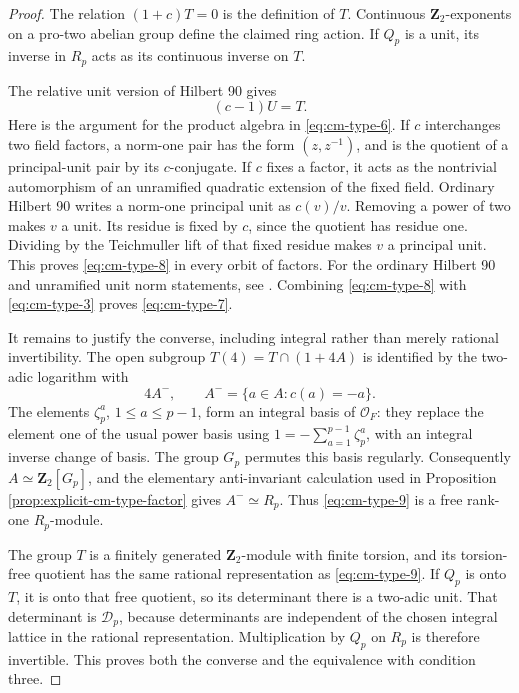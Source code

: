 \begin{proof}
The relation \((1+c)T=0\) is the definition of \(T\). Continuous
\(\mathbf Z_2\)-exponents on a pro-two abelian group define the
claimed ring action. If \(Q_p\) is a unit, its inverse in \(R_p\)
acts as its continuous inverse on \(T\).

The relative unit version of Hilbert 90 gives
\begin{equation}
                             (c-1)U=T.                  \label{eq:cm-type-8}
\end{equation}
Here is the argument for the product algebra in \eqref{eq:cm-type-6}. If \(c\)
interchanges two field factors, a norm-one pair has the form
\((z,z^{-1})\), and is the quotient of a principal-unit pair
by its \(c\)-conjugate. If \(c\) fixes a factor, it acts as the
nontrivial automorphism of an unramified quadratic extension of
the fixed field. Ordinary Hilbert 90 writes a norm-one principal
unit as \(c(v)/v\). Removing a power of two makes \(v\) a unit.
Its residue is fixed by \(c\), since the quotient has residue one.
Dividing by the Teichmuller lift of that fixed residue makes
\(v\) a principal unit. This proves \eqref{eq:cm-type-8} in every orbit of
factors. For the ordinary Hilbert 90 and unramified unit norm
statements, see \cite[II, Proposition~1.22 and Corollary~1.23,
p.~67; III, Propositions~1.1--1.2, pp.~97--98]{MilneCFT}.
Combining \eqref{eq:cm-type-8} with \eqref{eq:cm-type-3} proves \eqref{eq:cm-type-7}.

It remains to justify the converse, including integral rather than
merely rational invertibility. The open subgroup
\(T(4)=T\cap(1+4A)\) is identified by the two-adic logarithm with
\begin{equation}
      4A^-,\qquad A^-=\{a\in A:c(a)=-a\}.               \label{eq:cm-type-9}
\end{equation}
The elements \(\zeta_p^a\), \(1\leq a\leq p-1\), form an
integral basis of \(\mathcal O_F\): they replace the element one
of the usual power basis using
\(1=-\sum_{a=1}^{p-1}\zeta_p^a\), with an integral inverse
change of basis. The group \(G_p\) permutes this basis regularly.
Consequently \(A\simeq\mathbf Z_2[G_p]\), and the elementary
anti-invariant calculation used in Proposition
\ref{prop:explicit-cm-type-factor} gives \(A^-\simeq R_p\).
Thus \eqref{eq:cm-type-9} is a free rank-one \(R_p\)-module.

The group \(T\) is a finitely generated \(\mathbf Z_2\)-module
with finite torsion, and its torsion-free quotient has the same
rational representation as \eqref{eq:cm-type-9}. If \(Q_p\) is onto \(T\),
it is onto that free quotient, so its determinant there is a
two-adic unit. That determinant is \(\mathcal D_p\), because
determinants are independent of the chosen integral lattice in
the rational representation. Multiplication by \(Q_p\) on
\(R_p\) is therefore invertible. This proves both the converse
and the equivalence with condition three.
\end{proof}

